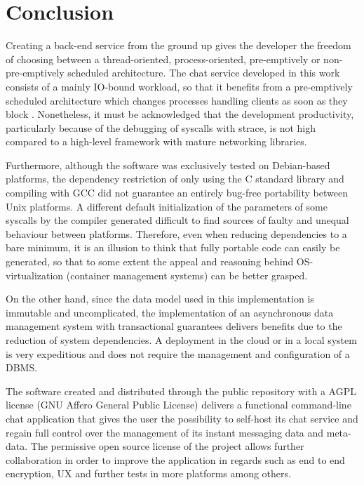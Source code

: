 \section{Conclusion}
Creating a back-end service from the ground up gives the developer the freedom of choosing between a thread-oriented, process-oriented, pre-emptively or non-pre-emptively scheduled architecture. The chat service developed in this work consists of a mainly IO-bound workload, so that it benefits from a pre-emptively scheduled architecture which changes processes handling clients as soon as they block \cite{Kennedy2018}. Nonetheless, it must be acknowledged that the development productivity, particularly because of the debugging of syscalls with strace, is not high compared to a high-level framework with mature networking libraries.

Furthermore, although the software was exclusively tested on Debian-based platforms, the dependency restriction of only using the C standard library and compiling with GCC did not guarantee an entirely bug-free portability between Unix platforms. A different default initialization of the parameters of some syscalls by the compiler generated difficult to find sources of faulty and unequal behaviour between platforms. Therefore, even when reducing dependencies to a bare minimum, it is an illusion to think that fully portable code can easily be generated, so that to some extent the appeal and reasoning behind OS-virtualization (container management systems) can be better grasped.

On the other hand, since the data model used in this implementation is immutable and uncomplicated, the implementation of an asynchronous data management system with transactional guarantees delivers benefits due to the reduction of system dependencies. A deployment in the cloud or in a local system is very expeditious and does not require the management and configuration of a DBMS.

The software created and distributed through the public repository with a AGPL license (GNU Affero General Public License) delivers a functional command-line chat application that gives the user the possibility to self-host its chat service and regain full control over the management of its instant messaging data and meta-data. The permissive open source license of the project allows further collaboration in order to improve the application in regards such as end to end encryption, UX and further tests in more platforms among others.